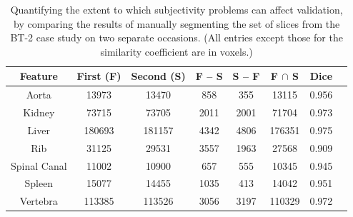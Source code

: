 \begin{table}[t]
\begin{center}
\begin{tabular}{c|ccccccc}
\footnotesize \textbf{Feature} & \footnotesize \textbf{First (F)} & \footnotesize \textbf{Second (S)} & \footnotesize \textbf{F -- S} & \footnotesize \textbf{S -- F} & \footnotesize \textbf{F $\cap$ S} & \footnotesize \textbf{Dice} \\
\hline
\footnotesize Aorta & \footnotesize 13973 & \footnotesize 13470 & \footnotesize 858 & \footnotesize 355 & \footnotesize 13115 & \footnotesize 0.956 \\
\footnotesize Kidney & \footnotesize 73715 & \footnotesize 73705 & \footnotesize 2011 & \footnotesize 2001 & \footnotesize 71704 & \footnotesize 0.973 \\
\footnotesize Liver & \footnotesize 180693 & \footnotesize 181157 & \footnotesize 4342 & \footnotesize 4806 & \footnotesize 176351 & \footnotesize 0.975 \\
\footnotesize Rib & \footnotesize 31125 & \footnotesize 29531 & \footnotesize 3557 & \footnotesize 1963 & \footnotesize 27568 & \footnotesize 0.909 \\
\footnotesize Spinal Canal & \footnotesize 11002 & \footnotesize 10900 & \footnotesize 657 & \footnotesize 555 & \footnotesize 10345 & \footnotesize 0.945 \\
\footnotesize Spleen & \footnotesize 15077 & \footnotesize 14455 & \footnotesize 1035 & \footnotesize 413 & \footnotesize 14042 & \footnotesize 0.951 \\
\footnotesize Vertebra & \footnotesize 113385 & \footnotesize 113526 & \footnotesize 3056 & \footnotesize 3197 & \footnotesize 110329 & \footnotesize 0.972 \\
\end{tabular}
\end{center}
\caption{Quantifying the extent to which subjectivity problems can affect validation, by comparing the results of manually segmenting the set of slices from the BT-2 case study on two separate occasions. (All entries except those for the similarity coefficient are in voxels.)}
\label{tbl:validation-subjectivity}
\end{table}

